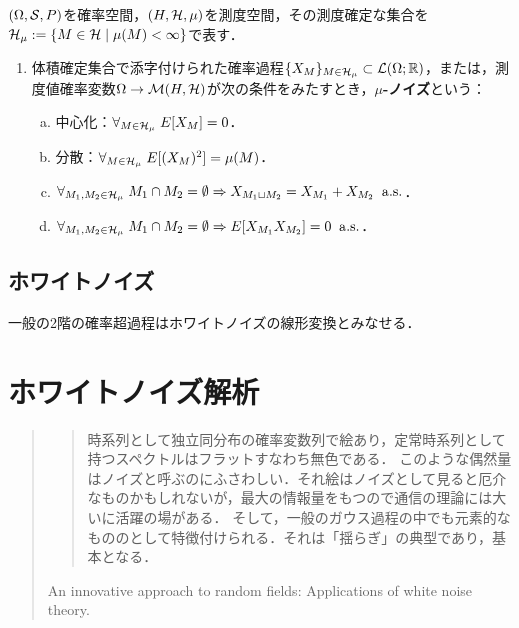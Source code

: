 \documentclass[uplatex,dvipdfmx]{jsreport}
\begin{document}
\begin{definition}
    $(\Omega,\mathcal{S},P)$を確率空間，$(H,\mathcal{H},\mu)$を測度空間，その測度確定な集合を$\mathcal{H}_\mu:=\{M\in\mathcal{H}\mid\mu(M)<\infty\}$で表す．
    \begin{enumerate}
        \item 体積確定集合で添字付けられた確率過程$\{X_M\}_{M\in\mathcal{H}_\mu}\subset\mathcal{L}(\Omega;\mathbb{R})$，または，測度値確率変数$\Omega\to\mathcal{M}(H,\mathcal{H})$が次の条件をみたすとき，\textbf{$\mu$-ノイズ}という：
        \begin{enumerate}[(a)]
            \item 中心化：$\forall_{M\in\mathcal{H}_\mu}\;E[X_M]=0$．
            \item 分散：$\forall_{M\in\mathcal{H}_\mu}\;E[(X_M)^2]=\mu(M)$．
            \item $\forall_{M_1,M_2\in\mathcal{H}_\mu}\;M_1\cap M_2=\emptyset\Rightarrow X_{M_1\sqcup M_2}=X_{M_1}+X_{M_2}\;\;\mathrm{a.s.}$．
            \item $\forall_{M_1,M_2\in\mathcal{H}_\mu}\;M_1\cap M_2=\emptyset\Rightarrow E[X_{M_1}X_{M_2}]=0\;\;\mathrm{a.s.}$．
        \end{enumerate}
    \end{enumerate}
\end{definition}

\subsection{ホワイトノイズ}

\begin{tcolorbox}[colframe=ForestGreen, colback=ForestGreen!10!white,breakable,colbacktitle=ForestGreen!40!white,coltitle=black,fonttitle=\bfseries\sffamily,
title=]
    一般の2階の確率超過程はホワイトノイズの線形変換とみなせる．
\end{tcolorbox}

\section{ホワイトノイズ解析}

\begin{quotation}
    \begin{quote}
        時系列として独立同分布の確率変数列で絵あり，定常時系列として持つスペクトルはフラットすなわち無色である．
        このような偶然量はノイズと呼ぶのにふさわしい．それ絵はノイズとして見ると厄介なものかもしれないが，最大の情報量をもつので通信の理論には大いに活躍の場がある．
        そして，一般のガウス過程の中でも元素的なもののとして特徴付けられる．それは「揺らぎ」の典型であり，基本となる．
    \end{quote}
    An innovative approach to random fields: Applications of white noise theory.
\end{quotation}
\end{document}
